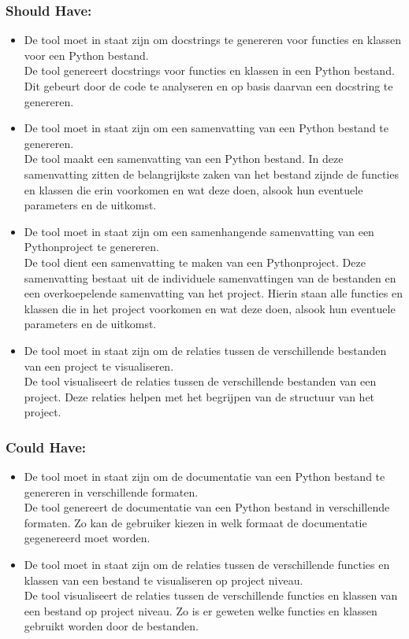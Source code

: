 \subsubsection{Should Have:}
\begin{itemize}
    \item De tool moet in staat zijn om docstrings te genereren voor functies en klassen voor een Python bestand.\\
    De tool genereert docstrings voor functies en klassen in een Python bestand. Dit gebeurt door de code te analyseren en op basis daarvan een docstring te genereren.
    \item De tool moet in staat zijn om een samenvatting van een Python bestand te genereren.\\
    De tool maakt een samenvatting van een Python bestand. In deze samenvatting zitten de belangrijkste zaken van het bestand zijnde de functies en klassen die erin voorkomen en wat deze doen, alsook hun eventuele parameters en de uitkomst.
    \item De tool moet in staat zijn om een samenhangende samenvatting van een Pythonproject te genereren.\\
    De tool dient een samenvatting te maken van een Pythonproject. Deze samenvatting bestaat uit de individuele samenvattingen van de bestanden en een overkoepelende samenvatting van het project.
    Hierin staan alle functies en klassen die in het project voorkomen en wat deze doen, alsook hun eventuele parameters en de uitkomst.
    \item De tool moet in staat zijn om de relaties tussen de verschillende bestanden van een project te visualiseren.\\
    De tool visualiseert de relaties tussen de verschillende bestanden van een project. Deze relaties helpen met het begrijpen van de structuur van het project.
\end{itemize}

\subsubsection{Could Have:}
\begin{itemize}
    \item De tool moet in staat zijn om de documentatie van een Python bestand te genereren in verschillende formaten.\\
    De tool genereert de documentatie van een Python bestand in verschillende formaten. Zo kan de gebruiker kiezen in welk formaat de documentatie gegenereerd moet worden.
    \item De tool moet in staat zijn om de relaties tussen de verschillende functies en klassen van een bestand te visualiseren op project niveau.\\
    De tool visualiseert de relaties tussen de verschillende functies en klassen van een bestand op project niveau. Zo is er geweten welke functies en klassen gebruikt worden door de bestanden.
\end{itemize}

